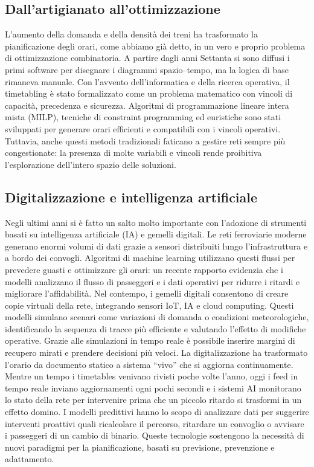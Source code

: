 \documentclass[a4paper,12pt]{report}
\begin{document}
\subsection{Dall’artigianato all’ottimizzazione}
L’aumento della domanda e della densità dei treni ha trasformato la pianificazione degli orari, come abbiamo già detto, in un vero e proprio problema di ottimizzazione combinatoria. A partire dagli anni Settanta si sono diffusi i primi software per disegnare i diagrammi spazio–tempo, ma la logica di base rimaneva manuale. Con l’avvento dell’informatica e della ricerca operativa, il timetabling è stato formalizzato come un problema matematico con vincoli di capacità, precedenza e sicurezza. Algoritmi di programmazione lineare intera mista (MILP), tecniche di constraint programming ed euristiche sono stati sviluppati per generare orari efficienti e compatibili con i vincoli operativi.
Tuttavia, anche questi metodi tradizionali faticano a gestire reti sempre più congestionate: la presenza di molte variabili e vincoli rende proibitiva l’esplorazione dell’intero spazio delle soluzioni.



\subsection{Digitalizzazione e intelligenza artificiale}
Negli ultimi anni si è fatto un salto molto importante con l’adozione di strumenti basati su intelligenza artificiale (IA) e gemelli digitali. Le reti ferroviarie moderne generano enormi volumi di dati grazie a sensori distribuiti lungo l’infrastruttura e a bordo dei convogli. Algoritmi di machine learning utilizzano questi flussi per prevedere guasti e ottimizzare gli orari: un recente rapporto evidenzia che i modelli analizzano il flusso di passeggeri e i dati operativi per ridurre i ritardi e migliorare l’affidabilità.
Nel contempo, i gemelli digitali consentono di creare copie virtuali della rete, integrando sensori IoT, IA e cloud computing. Questi modelli simulano scenari come variazioni di domanda o condizioni meteorologiche, identificando la sequenza di tracce più efficiente e valutando l’effetto di modifiche operative.
Grazie alle simulazioni in tempo reale è possibile inserire margini di recupero mirati e prendere decisioni più veloci.
La digitalizzazione ha trasformato l’orario da documento statico a sistema “vivo” che si aggiorna continuamente. Mentre un tempo i timetables venivano rivisti poche volte l’anno, oggi i feed in tempo reale inviano aggiornamenti ogni pochi secondi e i sistemi AI monitorano lo stato della rete per intervenire prima che un piccolo ritardo si trasformi in un effetto domino.
I modelli predittivi hanno lo scopo di analizzare dati per suggerire interventi proattivi quali ricalcolare il percorso, ritardare un convoglio o avvisare i passeggeri di un cambio di binario.
Queste tecnologie sostengono la necessità di nuovi paradigmi per la pianificazione, basati su previsione, prevenzione e adattamento.
\end{document}
